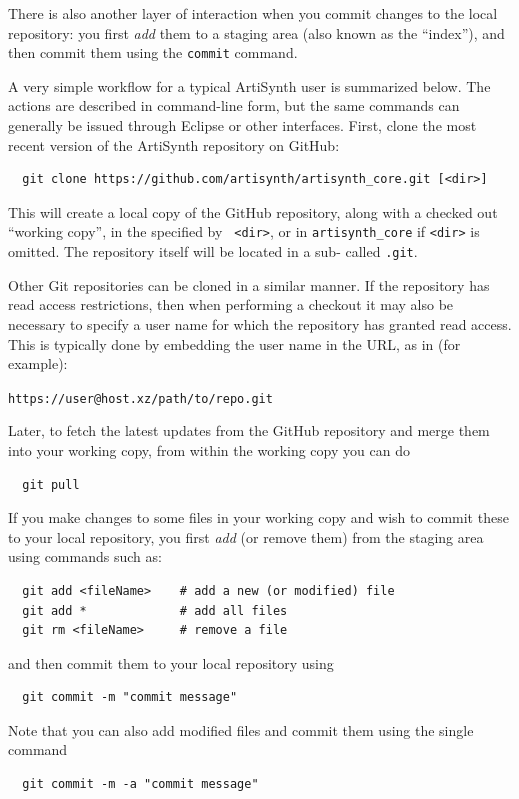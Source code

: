 There is also another layer of interaction when you commit changes to
the local repository: you first {\it add} them to a staging area
(also known as the ``index''), and then commit them using the {\tt commit}
command.

A very simple workflow for a typical ArtiSynth user is summarized
below. The actions are described in command-line form, but the same
commands can generally be issued through Eclipse or other
interfaces. First, clone the most recent version of the ArtiSynth
repository on GitHub:

\begin{verbatim}
  git clone https://github.com/artisynth/artisynth_core.git [<dir>]
\end{verbatim}

This will create a local copy of the GitHub repository, along with a
checked out ``working copy'', in the \directory{} specified by {\tt
<dir>}, or in {\tt artisynth\_core} if {\tt <dir>} is
omitted.  The repository itself will be located in a sub-\directory{}
called {\tt .git}.

Other Git repositories can be cloned in a similar manner.  If the
repository has read access restrictions, then when performing a checkout it
may also be necessary to specify a user name for which the repository
has granted read access. This is typically done by embedding the user
name in the URL, as in (for example):

{\tt https://user@host.xz/path/to/repo.git}

Later, to fetch the latest updates from the GitHub repository and
merge them into your working copy, from within the working copy
\directory{} you can do
\begin{verbatim}
  git pull
\end{verbatim}

If you make changes to some files in your working copy and wish to
commit these to your local repository, you first {\it add} (or remove
them) from the staging area using commands such as:
\begin{verbatim}
  git add <fileName>    # add a new (or modified) file
  git add *             # add all files
  git rm <fileName>     # remove a file
\end{verbatim}
and then commit them to your local repository using
\begin{verbatim}
  git commit -m "commit message"
\end{verbatim}
Note that you can also add modified files and commit them using the single
command
\begin{verbatim}
  git commit -m -a "commit message"
\end{verbatim}


